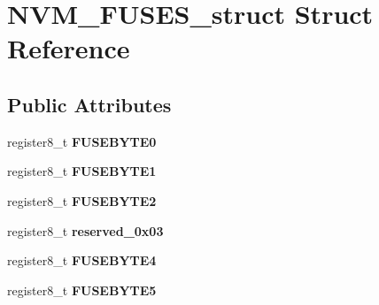 \hypertarget{struct_n_v_m___f_u_s_e_s__struct}{}\section{N\+V\+M\+\_\+\+F\+U\+S\+E\+S\+\_\+struct Struct Reference}
\label{struct_n_v_m___f_u_s_e_s__struct}
\subsection*{Public Attributes}
\begin{DoxyCompactItemize}
\item 
register8\+\_\+t {\bfseries F\+U\+S\+E\+B\+Y\+T\+E0}\hypertarget{struct_n_v_m___f_u_s_e_s__struct_a721e34b70c29f68ed1d3baa170cb27ad}{}\label{struct_n_v_m___f_u_s_e_s__struct_a721e34b70c29f68ed1d3baa170cb27ad}

\item 
register8\+\_\+t {\bfseries F\+U\+S\+E\+B\+Y\+T\+E1}\hypertarget{struct_n_v_m___f_u_s_e_s__struct_a22f658f6726849b3673ea12eec83188f}{}\label{struct_n_v_m___f_u_s_e_s__struct_a22f658f6726849b3673ea12eec83188f}

\item 
register8\+\_\+t {\bfseries F\+U\+S\+E\+B\+Y\+T\+E2}\hypertarget{struct_n_v_m___f_u_s_e_s__struct_ae66730c6c7afae7a6388e8516950f84b}{}\label{struct_n_v_m___f_u_s_e_s__struct_ae66730c6c7afae7a6388e8516950f84b}

\item 
register8\+\_\+t {\bfseries reserved\+\_\+0x03}\hypertarget{struct_n_v_m___f_u_s_e_s__struct_a45b60c8b16424759a7849796eb08c25a}{}\label{struct_n_v_m___f_u_s_e_s__struct_a45b60c8b16424759a7849796eb08c25a}

\item 
register8\+\_\+t {\bfseries F\+U\+S\+E\+B\+Y\+T\+E4}\hypertarget{struct_n_v_m___f_u_s_e_s__struct_af058f1b4be5af5b91ae4d1381a37a1fe}{}\label{struct_n_v_m___f_u_s_e_s__struct_af058f1b4be5af5b91ae4d1381a37a1fe}

\item 
register8\+\_\+t {\bfseries F\+U\+S\+E\+B\+Y\+T\+E5}\hypertarget{struct_n_v_m___f_u_s_e_s__struct_af6e518b1b1550cd51e69b7ca1cb14733}{}\label{struct_n_v_m___f_u_s_e_s__struct_af6e518b1b1550cd51e69b7ca1cb14733}

\end{DoxyCompactItemize}


